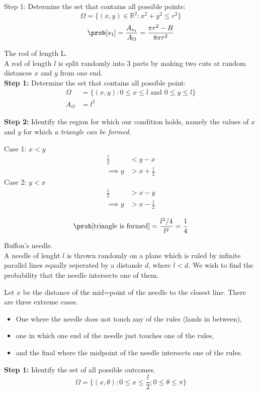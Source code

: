 \newpage
{}
Step 1: Determine the set that contains all possible points:
\[\Omega = \{(x,y) \in \mathbb R^2 \colon x^2 + y^2 \leq r^2\}   \]
\[\prob[s_1] = \frac{A_{s_1}}{A_\Omega} = \frac{\pi r^2 - B}{8\pi r^2}\]


\begin{problem}
  The rod of length L.\\
  A rod of length $l$ is split randomly into 3 parts by making two cuts at random distances $x$ and $y$ from one end.\\

  \textbf{Step 1:} Determine the set that contains all possible point:
  \begin{align*}
    \Omega &= \{(x,y) \colon 0 \leq x \leq l \text{ and } 0 \leq y \leq l \}\\
    A_\Omega & = l^2
  \end{align*}

  \textbf{Step 2:} Identify the region for which our condition holds, namely the values of $x$ and $y$ for which \emph{a triangle can be formed}.

  Case 1: $x<y$ 
    \begin{align*}
      \frac{l}{2} &< y-x\\
      \implies y &> x + \frac{l}{2}
    \end{align*}
  Case 2:  $y<x$ 
  \begin{align*}
    \frac{l}{2} &> x-y\\
    \implies y &> x - \frac{l}{2}
  \end{align*}

  \[\prob[\text{triangle is formed}] = \frac{l^2 / 4}{l^2} = \frac{1}{4}\]
\end{problem}

\begin{problem}
  Buffon's needle.\\
  A needle of lenght $l$ is thrown randomly on a plane which is ruled by infinite parallel lines equally seperated by a distande $d$, where $l<d$. We wish to find the probability that the needle intersects one of them.

  Let $x$ be the distance of the mid=point of the needle to the closest line. There are three extreme cases. 
\begin{itemize}
  \item  One where the needle does not touch any of the rules (lands in between),
  \item one in which one end of the needle just touches one of the rules,
  \item and the final where the midpoint of the needle intersects one of the rules.
\end{itemize}
  
\textbf{Step 1:} Identify the set of all possible outcomes.
\[\Omega = \{(x,\theta) : 0 \leq x \leq \frac{l}{2} ; 0 \leq \theta \leq \pi\} \]

\end{problem}
